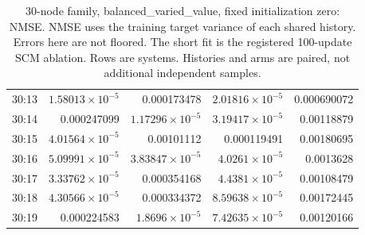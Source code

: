 \begin{table}[ht]
\begin{tabular}{lrrrr}
30:13 & $1.58013\times10^{-5}$ & 0.000173478 & $2.01816\times10^{-5}$ & 0.000690072\\
30:14 & 0.000247099 & $1.17296\times10^{-5}$ & $3.19417\times10^{-5}$ & 0.00118879\\
30:15 & $4.01564\times10^{-5}$ & 0.00101112 & 0.000119491 & 0.00180695\\
30:16 & $5.09991\times10^{-5}$ & $3.83847\times10^{-5}$ & $4.0261\times10^{-5}$ & 0.0013628\\
30:17 & $3.33762\times10^{-5}$ & 0.000354168 & $4.4381\times10^{-5}$ & 0.00108479\\
30:18 & $4.30566\times10^{-5}$ & 0.000334372 & $8.59638\times10^{-5}$ & 0.00172445\\
30:19 & 0.000224583 & $1.8696\times10^{-5}$ & $7.42635\times10^{-5}$ & 0.00120166\\
\bottomrule
\end{tabular}
\caption{30-node family, balanced\_varied\_value, fixed initialization zero: NMSE. NMSE uses the training target variance of each shared history. Errors here are not floored. The short fit is the registered 100-update SCM ablation. Rows are systems. Histories and arms are paired, not additional independent samples.}
\end{table}
